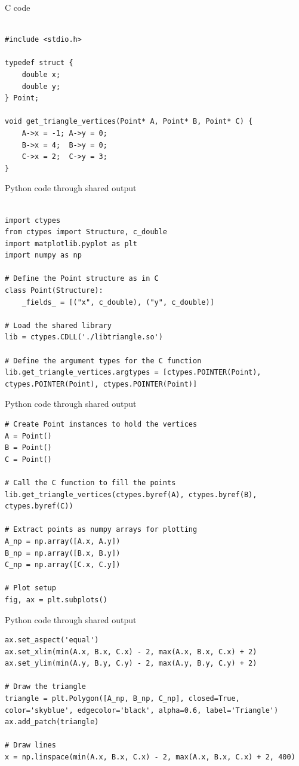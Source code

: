 \documentclass{beamer}
\begin{document}
\begin{frame}[fragile]{C code}
\begin{lstlisting}

#include <stdio.h>

typedef struct {
    double x;
    double y;
} Point;

void get_triangle_vertices(Point* A, Point* B, Point* C) {
    A->x = -1; A->y = 0;
    B->x = 4;  B->y = 0;
    C->x = 2;  C->y = 3;
}

 \end{lstlisting}
\end{frame}
\begin{frame}[fragile]{Python code through shared output}
\begin{lstlisting}

import ctypes
from ctypes import Structure, c_double
import matplotlib.pyplot as plt
import numpy as np

# Define the Point structure as in C
class Point(Structure):
    _fields_ = [("x", c_double), ("y", c_double)]

# Load the shared library
lib = ctypes.CDLL('./libtriangle.so')

# Define the argument types for the C function
lib.get_triangle_vertices.argtypes = [ctypes.POINTER(Point), ctypes.POINTER(Point), ctypes.POINTER(Point)]
 \end{lstlisting}
\end{frame}
\begin{frame}[fragile]{Python code through shared output}
\begin{lstlisting}
# Create Point instances to hold the vertices
A = Point()
B = Point()
C = Point()

# Call the C function to fill the points
lib.get_triangle_vertices(ctypes.byref(A), ctypes.byref(B), ctypes.byref(C))

# Extract points as numpy arrays for plotting
A_np = np.array([A.x, A.y])
B_np = np.array([B.x, B.y])
C_np = np.array([C.x, C.y])

# Plot setup
fig, ax = plt.subplots()
 \end{lstlisting}
\end{frame}
\begin{frame}[fragile]{Python code through shared output}
\begin{lstlisting}
ax.set_aspect('equal')
ax.set_xlim(min(A.x, B.x, C.x) - 2, max(A.x, B.x, C.x) + 2)
ax.set_ylim(min(A.y, B.y, C.y) - 2, max(A.y, B.y, C.y) + 2)

# Draw the triangle
triangle = plt.Polygon([A_np, B_np, C_np], closed=True, color='skyblue', edgecolor='black', alpha=0.6, label='Triangle')
ax.add_patch(triangle)

# Draw lines
x = np.linspace(min(A.x, B.x, C.x) - 2, max(A.x, B.x, C.x) + 2, 400)
 \end{lstlisting}
\end{frame}
\end{document}
